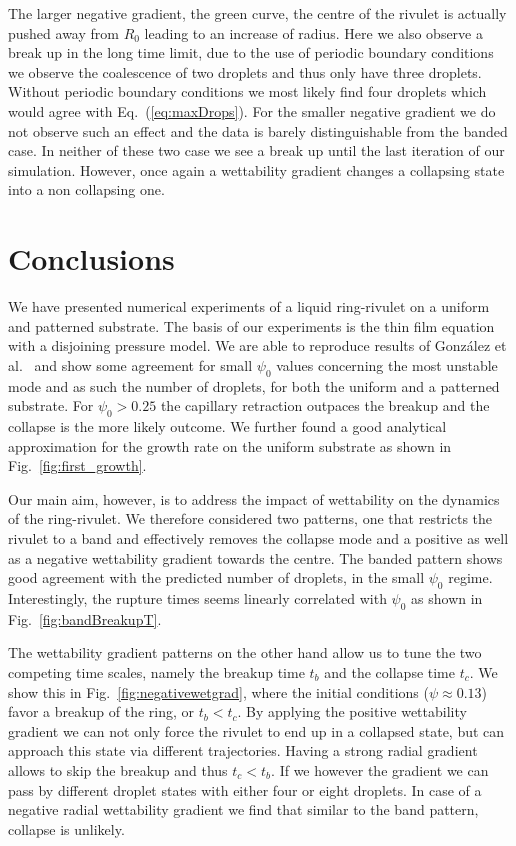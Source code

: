 \documentclass[twoside,twocolumn,9pt]{article}
\begin{document}
The larger negative gradient, the green curve, the centre of the rivulet is actually pushed away from $R_0$ leading to an increase of radius.
Here we also observe a break up in the long time limit, due to the use of periodic boundary conditions we observe the coalescence of two droplets and thus only have three droplets.
Without periodic boundary conditions we most likely find four droplets which would agree with Eq.~(\ref{eq:maxDrops}).
For the smaller negative gradient we do not observe such an effect and the data is barely distinguishable from the banded case.
In neither of these two case we see a break up until the last iteration of our simulation.
However, once again a wettability gradient changes a collapsing state into a non collapsing one.

\section{Conclusions}\label{sec:conclu}
We have presented numerical experiments of a liquid ring-rivulet on a uniform and patterned substrate. 
The basis of our experiments is the thin film equation with a disjoining pressure model.
We are able to reproduce results of Gonz{\'a}lez et al.~\cite{gonzalezStabilityLiquidRing2013} and show some agreement for small $\psi_0$ values concerning the most unstable mode and as such the number of droplets, for both the uniform and a patterned substrate.
For $\psi_0 > 0.25$ the capillary retraction outpaces the breakup and the collapse is the more likely outcome.
We further found a good analytical approximation for the growth rate on the uniform substrate as shown in Fig.~\ref{fig:first_growth}. 

Our main aim, however, is to address the impact of wettability on the dynamics of the ring-rivulet.
We therefore considered two patterns, one that restricts the rivulet to a band and effectively removes the collapse mode and a positive as well as a negative wettability gradient towards the centre.
The banded pattern shows good agreement with the predicted number of droplets, in the small $\psi_0$ regime. 
Interestingly, the rupture times seems linearly correlated with $\psi_0$ as shown in Fig.~\ref{fig:bandBreakupT}.

The wettability gradient patterns on the other hand allow us to tune the two competing time scales, namely the breakup time $t_b$ and the collapse time $t_c$.
We show this in Fig.~\ref{fig:negativewetgrad}, where the initial conditions ($\psi \approx 0.13$) favor a breakup of the ring, or $t_b < t_c$.
By applying the positive wettability gradient we can not only force the rivulet to end up in a collapsed state, but can approach this state via different trajectories. 
Having a strong radial gradient allows to skip the breakup and thus $t_c < t_b$.
If we however the gradient we can pass by different droplet states with either four or eight droplets.
In case of a negative radial wettability gradient we find that similar to the band pattern, collapse is unlikely.
\end{document}
